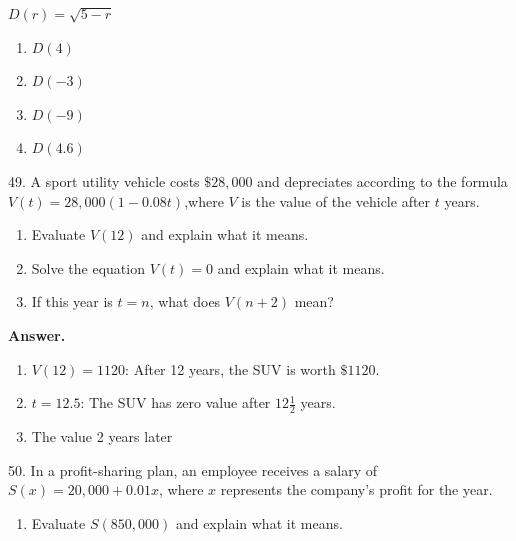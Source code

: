 \documentclass[10pt,]{book}
\theoremstyle{plain}
\theoremstyle{definition}
\theoremstyle{definition}
\theoremstyle{definition}
\theoremstyle{definition}
\numberwithin{equation}{part}
\begin{document}
\begin{exerciselist}
\begin{exercisegroup}
\begin{multicols}{2}
\end{multicols}
%
\exercise[48.]\hypertarget{exercise-117}{}\(D(r) =\sqrt{5-r}\) \leavevmode%
\begin{multicols}{2}
\begin{enumerate}[label=\alph*]
\item\hypertarget{li-449}{}\(D(4)\)%
\item\hypertarget{li-450}{}\(D(-3)\)%
\item\hypertarget{li-451}{}\(D(-9)\)%
\item\hypertarget{li-452}{}\(D(4.6)\)%
\end{enumerate}
\end{multicols}
%
\end{exercisegroup}
\par\smallskip\noindent
\item[49.]\hypertarget{exercise-118}{}A sport utility vehicle costs \(\$28,000\) and depreciates according to the formula \(V(t) = 28,000 (1 - 0.08t)\),where \(V\) is the value of the vehicle after \(t\) years. \leavevmode%
\begin{enumerate}[label=\alph*]
\item\hypertarget{li-453}{}Evaluate \(V(12)\) and explain what it means.%
\item\hypertarget{li-454}{}Solve the equation \(V(t) = 0\) and explain what it means.%
\item\hypertarget{li-455}{}If this year is \(t = n\), what does \(V(n + 2)\) mean?%
\end{enumerate}
%
\par\smallskip
\par\smallskip
\noindent\textbf{Answer.}\hypertarget{answer-68}{}\quad
\leavevmode%
\begin{enumerate}[label=\alph*]
\item\hypertarget{li-456}{}\(V(12) = 1120\): After 12 years, the SUV is worth \(\$1120\).%
\item\hypertarget{li-457}{}\(t = 12.5\): The SUV has zero value after \(12\frac{1}{2}\) years.%
\item\hypertarget{li-458}{}The value 2 years later%
\end{enumerate}
%
\item[50.]\hypertarget{exercise-119}{}In a profit-sharing plan, an employee receives a salary of \(S(x) = 20,000 + 0.01x\), where \(x\) represents the company's profit for the year. \leavevmode%
\begin{enumerate}[label=\alph*]
\item\hypertarget{li-459}{}Evaluate \(S(850,000)\) and explain what it means.%

\end{enumerate}
\end{exerciselist}
\end{document}
